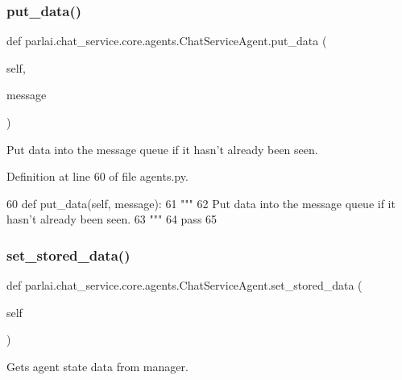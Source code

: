 \subsubsection{\texorpdfstring{put\+\_\+data()}{put\_data()}}
{\footnotesize\ttfamily def parlai.\+chat\+\_\+service.\+core.\+agents.\+Chat\+Service\+Agent.\+put\+\_\+data (\begin{DoxyParamCaption}\item[{}]{self,  }\item[{}]{message }\end{DoxyParamCaption})}

\begin{DoxyVerb}Put data into the message queue if it hasn't already been seen.
\end{DoxyVerb}
 

Definition at line 60 of file agents.\+py.


\begin{DoxyCode}
60     \textcolor{keyword}{def }put\_data(self, message):
61         \textcolor{stringliteral}{"""}
62 \textcolor{stringliteral}{        Put data into the message queue if it hasn't already been seen.}
63 \textcolor{stringliteral}{        """}
64         \textcolor{keywordflow}{pass}
65 
\end{DoxyCode}
\mbox{\label{classparlai_1_1chat__service_1_1core_1_1agents_1_1ChatServiceAgent_aec768d94205566700ac4addfc4740166}} 
\subsubsection{\texorpdfstring{set\+\_\+stored\+\_\+data()}{set\_stored\_data()}}
{\footnotesize\ttfamily def parlai.\+chat\+\_\+service.\+core.\+agents.\+Chat\+Service\+Agent.\+set\+\_\+stored\+\_\+data (\begin{DoxyParamCaption}\item[{}]{self }\end{DoxyParamCaption})}

\begin{DoxyVerb}Gets agent state data from manager.
\end{DoxyVerb}
 

